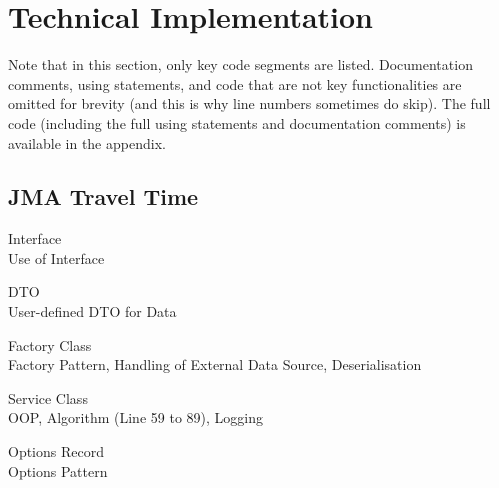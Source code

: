 \chapter{Technical Implementation}

Note that in this section, only key code segments are listed. Documentation comments, using statements, and code that are not key functionalities are omitted for brevity (and this is why line numbers sometimes do skip). The full code (including the full using statements and documentation comments) is available in the appendix.

\section{JMA Travel Time}
\begin{normallisting}
    \caption[ Interface]{ Interface \\ Use of Interface}
\end{normallisting}

\begin{normallisting}
    \caption[ DTO]{ DTO \\ User-defined DTO for Data}
\end{normallisting}

\begin{normallisting}
    \caption[ Factory Class]{ Factory Class \\ Factory Pattern, Handling of External Data Source, Deserialisation}
\end{normallisting}

\begin{normallisting}
    \caption[ Service Class]{ Service Class \\ OOP, Algorithm (Line 59 to 89), Logging}
\end{normallisting}

\begin{normallisting}
    \caption[ Options Record]{ Options Record \\ Options Pattern}
\end{normallisting}